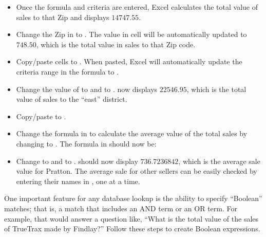 \begin{itemize}[resume]
	\item Once the formula and criteria are entered, Excel calculates the total value of sales to that Zip and displays $ 14747.55 $.
	\item Change the Zip in  to . The value in cell  will be automatically updated to $ 748.50 $, which is the total value in sales to that Zip code.
	\item Copy/paste cells  to . When pasted, Excel will automatically update the criteria range in the formula to .
	\item Change the value of  to  and  to .  now displays $ 22546.95 $, which is the total value of sales to the ``east'' district.
	\item Copy/paste  to .
	\item Change the formula in  to calculate the average value of the total sales by changing  to . The formula in  should now be: 
	\item Change  to  and  to .  should now display $ 736.7236842 $, which is the average sale value for Pratton. The average sale for other sellers can be easily checked by entering their names in , one at a time.
\end{itemize}

One important feature for any database lookup is the ability to specify ``Boolean'' matches; that is, a match that includes an AND term or an OR term. For example, that would answer a question like, ``What is the total value of the sales of TrueTrax made by Findlay?'' Follow these steps to create Boolean expressions.

